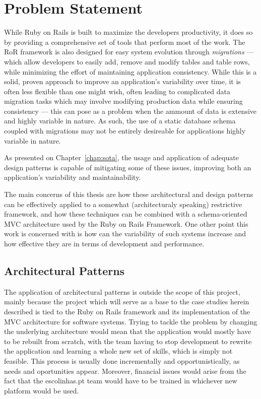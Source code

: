 \chapter{Problem Statement}\label{chap:problem_statement}

While Ruby on Rails is built to maximize the developers productivity, it does so by providing a comprehensive set of tools that perform most of the work. The RoR framework is also designed for easy system evolution through \emph{migrations} --- which allow developers to easily add, remove and modify tables and table rows, while minimizing the effort of maintaining application consistency. While this is a solid, proven approach to improve an application's variability over time, it is often less flexible than one might wish, often leading to complicated data migration tasks which may involve modifying production data while ensuring consistency --- this can pose as a problem when the ammount of data is extensive and highly variable in nature. As such, the use of a static database schema coupled with migrations may not be entirely desireable for applications highly variable in nature.

As presented on Chapter~\ref{chap:sota}, the usage and application of adequate design patterns is capable of mitigating some of these issues, improving both an application's variability and maintainability.

The main concerns of this thesis are how these architectural and design patterns can be effectively applied to a somewhat (architecturaly speaking) restrictive framework, and how these techniques can be combined with a schema-oriented MVC architecture used by the Ruby on Rails Framework. One other point this work is concerned with is how can the variability of such systems increase and how effective they are in terms of development and performance.

\section{Architectural Patterns}\label{sec:architectural_patterns}

The application of architectural patterns is outside the scope of this project, mainly because the project which will serve as a base to the case studies herein described is tied to the Ruby on Rails framework and its implementation of the MVC architecture for software systems. Trying to tackle the problem by changing the underlying architecture would mean that the application would mostly have to be rebuilt from scratch, with the team having to stop development to rewrite the application and learning a whole new set of skills, which is simply not feasible. This process is usually done incrementally and opportunistically, as needs and oportunities appear. Moreover, financial issues would arise from the fact that the escolinhas.pt team would have to be trained in whichever new platform would be used.

